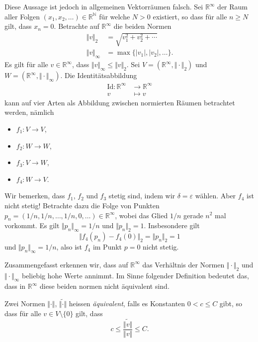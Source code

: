 \documentclass[../main.tex]{subfiles}
\begin{document}
Diese Aussage ist jedoch in allgemeinen Vektorräumen falsch.
Sei $\mathbb{R}^{\infty}$ der Raum aller Folgen
$(x_{1}, x_{2}, \dots) \in \mathbb{R}^{\mathbb{N}}$ 
für welche $N > 0$ existiert, so dass für alle $n \geq N$ 
gilt, dass $x_n = 0$.
Betrachte auf $\mathbb{R}^{\infty}$ die beiden Normen
\begin{align*}
  \Vert v \Vert_2 & = \sqrt{v_1^2 + v_2^2 + \cdots} \\
  \Vert v \Vert_{\infty} &= \max \{|v_1|, |v_2|, \dots\}.
\end{align*}
Es gilt für alle $v \in \mathbb{R}^{\infty}$,
dass $\Vert v \Vert_{\infty} \leq \Vert v \Vert_2$.
Sei $V = (\mathbb{R}^{\infty}, \Vert \cdot \Vert_2)$ 
und $W = (\mathbb{R}^{\infty}, \Vert \cdot \Vert_{\infty})$.
Die Identitätsabbildung
\begin{align*}
  \text{Id} \colon \mathbb{R}^{\infty} & \to \mathbb{R}^{\infty} \\
  v & \mapsto v
\end{align*}
kann auf vier Arten als Abbildung zwischen normierten Räumen
betrachtet werden, nämlich
\begin{itemize}
  \item $f_1 \colon V \to V$,
  \item $f_2 \colon W \to W$,
  \item $f_3 \colon V \to W$,
  \item $f_4 \colon W \to V$.
\end{itemize}
Wir bemerken, dass $f_1$, $f_2$ und $f_3$ stetig
sind, indem wir $\delta = \varepsilon$ wählen.
Aber $f_4$ ist nicht stetig!
Betrachte dazu die Folge von Punkten
$p_n = (1/n, 1/n, \dots, 1/n, 0, \dots) \in \mathbb{R}^{\infty}$,
wobei das Glied $1/n$ gerade $n^2$ mal vorkommt.
Es gilt $\Vert p_n \Vert_{\infty} = 1/n$ 
und $\Vert p_n \Vert_{2} = 1$.
Insbesondere gilt
\[
  \Vert f_4(p_n) - f_4(0) \Vert_2 = \Vert p_n \Vert_2 = 1
\]
und $\Vert p_n \Vert_{\infty} = 1/n$,
also ist $f_4$ im Punkt $p = 0$ nicht stetig.

Zusammengefasst erkennen wir, dass auf $\mathbb{R}^{\infty}$ 
das Verhältnis der Normen $\Vert \cdot \Vert_2$ 
und $\Vert \cdot \Vert_{\infty}$ beliebig hohe Werte annimmt.
Im Sinne folgender Definition bedeutet das, dass in
$\mathbb{R}^{\infty}$ diese beiden normen nicht äquivalent sind.

\begin{definition}
  Zwei Normen $\Vert \cdot \Vert$, $\widetilde{\Vert \cdot \Vert}$
  heissen \emph{äquivalent},
  falls es Konstanten $0 < c \leq C$ gibt,
  so dass für alle $v \in V \setminus \{0\}$ gilt, dass
  \[
    c \leq \frac{\widetilde{\Vert v \Vert}}{\Vert v \Vert} \leq C.
  \]
\end{definition}
\end{document}
